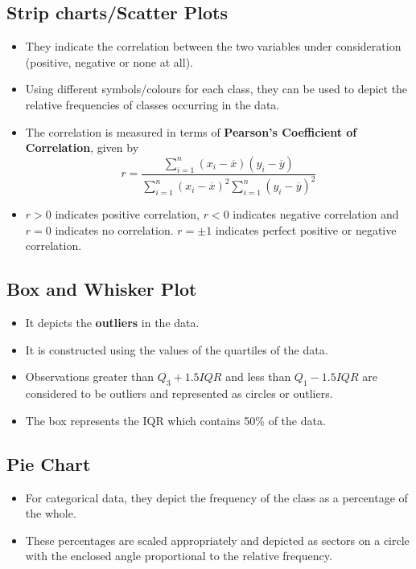 \documentclass{article}
\theoremstyle{plain}
\theoremstyle{definition}
\begin{document}
\subsection{Strip charts/Scatter Plots}
\begin{itemize}
    \item They indicate the correlation between the two variables under consideration (positive, negative or none at all).
    
    \item Using different symbols/colours for each class, they can be used to depict the relative frequencies of classes occurring in the data. 
    
    \item The correlation is measured in terms of \textbf{Pearson's Coefficient of Correlation}, given by
    \begin{equation}
        r = \frac{\sum_{i=1}^{n} (x_i - \overline{x}) (y_i - \overline{y})}{\sum_{i=1}^{n} (x_i - \overline{x})^2 \sum_{i=1}^{n} (y_i - \overline{y})^2}
    \end{equation}
    
    \item $r>0$ indicates positive correlation, $r<0$ indicates negative correlation and $r = 0$ indicates no correlation. $r = \pm 1$ indicates perfect positive or negative correlation. 
\end{itemize}

\subsection{Box and Whisker Plot}
\begin{itemize}
    \item It depicts the \textbf{outliers} in the data.
    
    \item It is constructed using the values of the quartiles of the data. 
    
    \item Observations greater than $Q_3 + 1.5 IQR$ and less than $Q_1 - 1.5IQR$ are considered to be outliers and represented as circles or outliers. 
    
    \item The box represents the IQR which contains 50\% of the data. 
\end{itemize}

\subsection{Pie Chart}
\begin{itemize}
    \item For categorical data, they depict the frequency of the class as a percentage of the whole.
    
    \item These percentages are scaled appropriately and depicted as sectors on a circle with the enclosed angle proportional to the relative frequency.
\end{itemize}
\end{document}
